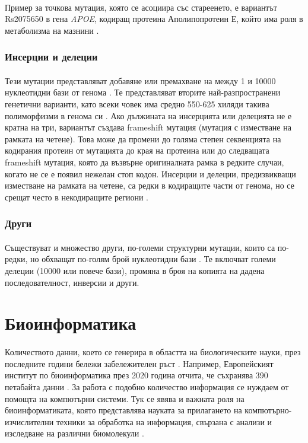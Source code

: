\documentclass[pdftex,cyrillic,14pt,a4page,twoside,openright]{extreport}
\begin{document}
\paragraph{}
Пример за точкова мутация, която се асоциира със стареенето, е вариантът Rs2075650 в гена \textit{APOE}, кодиращ протеина Аполипопротеин Е, който има роля в метаболизма на мазнини \cite{deelen2011, lu2014}.

\subsubsection{Инсерции и делеции}
\paragraph{}
Тези мутации представляват добавяне или премахване на между 1 и 10000 нуклеотидни бази от генома \cite{mullaney2010}. Те представляват вторите най-разпространени генетични варианти, като всеки човек има средно 550-625 хиляди такива полиморфизми в генома си \cite{auton2015}. Ако дължината на инсерцията или делецията не е кратна на три, вариантът създава frameshift мутация (мутация с изместване на рамката на четене). Това може да промени до голяма степен секвенцията на кодирания протеин от мутацията до края на протеина или до следващата frameshift мутация, която да възвърне оригиналната рамка в редките случаи, когато не се е появил нежелан стоп кодон. Инсерции и делеции, предизвикващи изместване на рамката на четене, са редки в кодиращите части от генома, но се срещат често в некодиращите региони \cite{bai2013}.

\subsubsection{Други}
\paragraph{}
Съществуват и множество други, по-големи структурни мутации, които са по-редки, но обхващат по-голям брой нуклеотидни бази \cite{auton2015}. Те включват големи делеции (10000 или повече бази), промяна в броя на копията на дадена последователност, инверсии и други.

\section{Биоинформатика}
\paragraph{}
Количеството данни, което се генерира в областта на биологическите науки, през последните години бележи забележителен ръст \cite{marx2013}. Например, Европейският институт по биоинформатика през 2020 година отчита, че съхранява 390 петабайта данни \cite{embl2021}. За работа с подобно количество информация се нуждаем от помощта на компютърни системи. Тук се явява и важната роля на биоинформатиката, която представлява науката за прилагането на компютърно-изчислителни техники за обработка на информация, свързана с анализи и изследване на различни биомолекули \cite{luscombe2001}.
\end{document}
